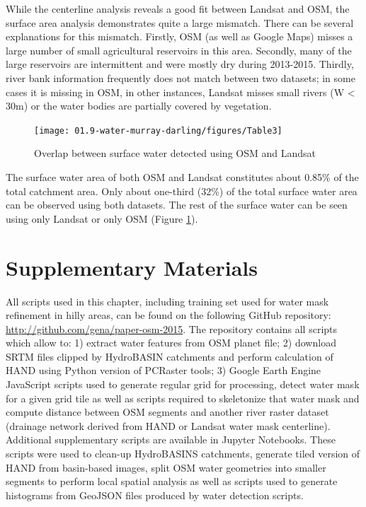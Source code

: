 While the centerline analysis reveals a good fit between Landsat and OSM, the surface area analysis demonstrates quite a large mismatch. There can be several explanations for this mismatch. Firstly, OSM (as well as Google Maps) misses a large number of small agricultural reservoirs in this area. Secondly, many of the large reservoirs are intermittent and were mostly dry during 2013-2015. Thirdly, river bank information frequently does not match between two datasets; in some cases it is missing in OSM, in other instances, Landsat misses small rivers (W < 30m) or the water bodies are partially covered by vegetation.

\begin{figure}
	\centering
	\texttt{[image: 01.9-water-murray-darling/figures/Table3]}
	\caption{Overlap between surface water detected using OSM and Landsat}
	\label{fig:final-overlap}
\end{figure}

The surface water area of both OSM and Landsat constitutes about 0.85\% of the total catchment area. Only about one-third (32\%) of the total surface water area can be observed using both datasets. The rest of the surface water can be seen using only Landsat or only OSM (Figure \ref{fig:final-overlap}).

\section{Supplementary Materials}
All scripts used in this chapter, including training set used for water mask refinement in hilly areas, can be found on the following GitHub repository: \url{http://github.com/gena/paper-osm-2015}. The repository contains all scripts which allow to: 1) extract water features from \gls{OSM} planet file; 2) download \gls{SRTM} files clipped by HydroBASIN catchments and perform calculation of \gls{HAND} using Python version of PCRaster tools; 3) Google Earth Engine JavaScript scripts used to generate regular grid for processing, detect water mask for a given grid tile as well as scripts required to skeletonize that water mask and compute distance between OSM segments and another river raster dataset (drainage network derived from \gls{HAND} or Landsat water mask centerline). Additional supplementary scripts are available in Jupyter Notebooks. These scripts were used to clean-up HydroBASINS catchments, generate tiled version of \gls{HAND} from basin-based images, split \gls{OSM} water geometries into smaller segments to perform local spatial analysis as well as scripts used to generate histograms from GeoJSON files produced by water detection scripts.

